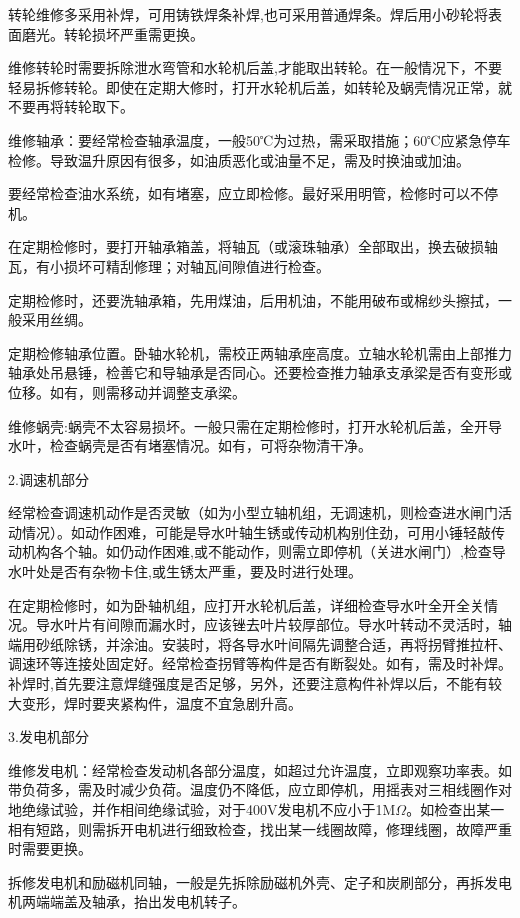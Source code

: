 \documentclass{ctexbook}
\begin{document}
转轮维修多采用补焊，可用铸铁焊条补焊,也可采用普通焊条。焊后用小砂轮将表面磨光。转轮损坏严重需更换。

维修转轮时需要拆除泄水弯管和水轮机后盖,才能取出转轮。在一般情况下，不要轻易拆修转轮。即使在定期大修时，打开水轮机后盖，如转轮及蜗壳情况正常，就不要再将转轮取下。

维修轴承：要经常检查轴承温度，一般50℃为过热，需采取措施；60℃应紧急停车检修。导致温升原因有很多，如油质恶化或油量不足，需及时换油或加油。

要经常检查油水系统，如有堵塞，应立即检修。最好采用明管，检修时可以不停机。

在定期检修时，要打开轴承箱盖，将轴瓦（或滚珠轴承）全部取出，换去破损轴瓦，有小损坏可精刮修理；对轴瓦间隙值进行检查。

定期检修时，还要洗轴承箱，先用煤油，后用机油，不能用破布或棉纱头擦拭，一般采用丝绸。

定期检修轴承位置。卧轴水轮机，需校正两轴承座高度。立轴水轮机需由上部推力轴承处吊悬锤，检善它和导轴承是否同心。还要检查推力轴承支承梁是否有变形或位移。如有，则需移动并调整支承梁。

维修蜗壳:蜗壳不太容易损坏。一般只需在定期检修时，打开水轮机后盖，全开导水叶，检查蜗壳是否有堵塞情况。如有，可将杂物清干净。

2.调速机部分

经常检查调速机动作是否灵敏（如为小型立轴机组，无调速机，则检查进水闸门活动情况）。如动作困难，可能是导水叶轴生锈或传动机构别住劲，可用小锤轻敲传动机构各个轴。如仍动作困难,或不能动作，则需立即停机（关进水闸门）,检查导水叶处是否有杂物卡住,或生锈太严重，要及时进行处理。

在定期检修时，如为卧轴机组，应打开水轮机后盖，详细检查导水叶全开全关情况。导水叶片有间隙而漏水时，应该锉去叶片较厚部位。导水叶转动不灵活时，轴端用砂纸除锈，并涂油。安装时，将各导水叶间隔先调整合适，再将拐臂推拉杆、调速环等连接处固定好。经常检查拐臂等构件是否有断裂处。如有，需及时补焊。补焊时,首先要注意焊缝强度是否足够，另外，还要注意构件补焊以后，不能有较大变形，焊时要夹紧构件，温度不宜急剧升高。

3.发电机部分

维修发电机：经常检查发动机各部分温度，如超过允许温度，立即观察功率表。如带负荷多，需及时减少负荷。温度仍不降低，应立即停机，用摇表对三相线圈作对地绝缘试验，并作相间绝缘试验，对于400V发电机不应小于1M$\Omega$。如检查出某一相有短路，则需拆开电机进行细致检查，找出某一线圈故障，修理线圈，故障严重时需要更换。

拆修发电机和励磁机同轴，一般是先拆除励磁机外壳、定子和炭刷部分，再拆发电机两端端盖及轴承，抬出发电机转子。
\end{document}
